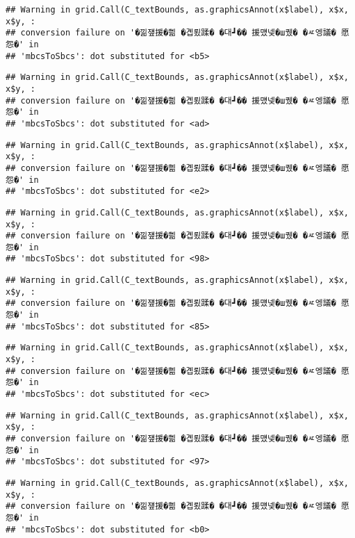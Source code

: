 \documentclass[
]{article}
\begin{document}
\begin{verbatim}
## Warning in grid.Call(C_textBounds, as.graphicsAnnot(x$label), x$x, x$y, :
## conversion failure on '�낆쟾援�쁾 �곕룄蹂� �대┛�� 援먰넻�ш퀬� �ㅼ엥議� 愿怨�' in
## 'mbcsToSbcs': dot substituted for <b5>
\end{verbatim}

\begin{verbatim}
## Warning in grid.Call(C_textBounds, as.graphicsAnnot(x$label), x$x, x$y, :
## conversion failure on '�낆쟾援�쁾 �곕룄蹂� �대┛�� 援먰넻�ш퀬� �ㅼ엥議� 愿怨�' in
## 'mbcsToSbcs': dot substituted for <ad>
\end{verbatim}

\begin{verbatim}
## Warning in grid.Call(C_textBounds, as.graphicsAnnot(x$label), x$x, x$y, :
## conversion failure on '�낆쟾援�쁾 �곕룄蹂� �대┛�� 援먰넻�ш퀬� �ㅼ엥議� 愿怨�' in
## 'mbcsToSbcs': dot substituted for <e2>
\end{verbatim}

\begin{verbatim}
## Warning in grid.Call(C_textBounds, as.graphicsAnnot(x$label), x$x, x$y, :
## conversion failure on '�낆쟾援�쁾 �곕룄蹂� �대┛�� 援먰넻�ш퀬� �ㅼ엥議� 愿怨�' in
## 'mbcsToSbcs': dot substituted for <98>
\end{verbatim}

\begin{verbatim}
## Warning in grid.Call(C_textBounds, as.graphicsAnnot(x$label), x$x, x$y, :
## conversion failure on '�낆쟾援�쁾 �곕룄蹂� �대┛�� 援먰넻�ш퀬� �ㅼ엥議� 愿怨�' in
## 'mbcsToSbcs': dot substituted for <85>
\end{verbatim}

\begin{verbatim}
## Warning in grid.Call(C_textBounds, as.graphicsAnnot(x$label), x$x, x$y, :
## conversion failure on '�낆쟾援�쁾 �곕룄蹂� �대┛�� 援먰넻�ш퀬� �ㅼ엥議� 愿怨�' in
## 'mbcsToSbcs': dot substituted for <ec>
\end{verbatim}

\begin{verbatim}
## Warning in grid.Call(C_textBounds, as.graphicsAnnot(x$label), x$x, x$y, :
## conversion failure on '�낆쟾援�쁾 �곕룄蹂� �대┛�� 援먰넻�ш퀬� �ㅼ엥議� 愿怨�' in
## 'mbcsToSbcs': dot substituted for <97>
\end{verbatim}

\begin{verbatim}
## Warning in grid.Call(C_textBounds, as.graphicsAnnot(x$label), x$x, x$y, :
## conversion failure on '�낆쟾援�쁾 �곕룄蹂� �대┛�� 援먰넻�ш퀬� �ㅼ엥議� 愿怨�' in
## 'mbcsToSbcs': dot substituted for <b0>
\end{verbatim}
\end{document}
